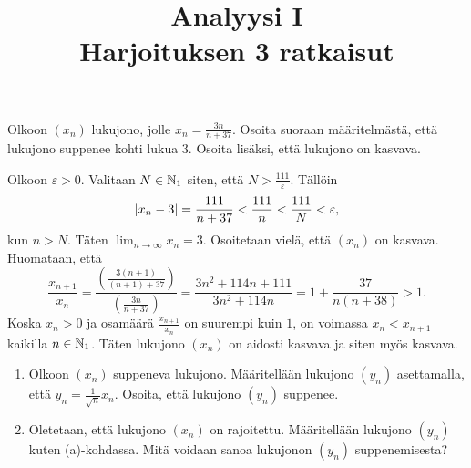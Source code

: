 \documentclass[11pt,a4paper]{amsart}
\title{Analyysi I\\Harjoituksen 3 ratkaisut}
\author{}
\date{}
\begin{document}

\begin{exercise}
  Olkoon \((x_n)\) lukujono, jolle \(x_n = \frac{3n}{n + 37}\). Osoita suoraan
  määritelmästä, että lukujono suppenee kohti lukua \(3\). Osoita lisäksi,
  että lukujono on kasvava.
\end{exercise}

\begin{solution}
  Olkoon \(\varepsilon > 0\). Valitaan \(N \in \mathbb{N}_1\) siten, että \(N >
  \frac{111}{\varepsilon}\). Tällöin
  \[
    \lvert x_n - 3\rvert = \frac{111}{n + 37} < \frac{111}{n} < \frac{111}{N}
    < \varepsilon,
  \]
  kun \(n > N\). Täten \(\lim_{n \to \infty} x_n = 3\). Osoitetaan vielä,
  että \((x_n)\) on kasvava. Huomataan, että
  \[
    \frac{x_{n + 1}}{x_n} = \frac{\left(\frac{3(n + 1)}{(n + 1) +
    37}\right)}{\left(\frac{3n}{n + 37}\right)} = \frac{3n^2 + 114n +
    111}{3n^2 + 114n} = 1 + \frac{37}{n(n + 38)} > 1.
  \]
  Koska \(x_n > 0\) ja osamäärä \(\frac{x_{n + 1}}{x_n}\) on suurempi
  kuin \(1\),
  on voimassa \(x_n < x_{n + 1}\) kaikilla \(n \in \mathbb{N}_1\). Täten
  lukujono \((x_n)\) on aidosti kasvava ja siten myös kasvava.
\end{solution}

\begin{exercise}
  \leavevmode\par
\begin{enumerate}[label=\alph*), nosep]
  \item Olkoon \((x_n)\) suppeneva lukujono. Määritellään lukujono \((y_n)\)
    asettamalla, että \(y_n = \frac{1}{\sqrt{n}}x_n\). Osoita, että lukujono
    \((y_n)\) suppenee.
  \item Oletetaan, että lukujono \((x_n)\) on rajoitettu. Määritellään lukujono
    \((y_n)\) kuten (a)-kohdassa. Mitä voidaan sanoa lukujonon \((y_n)\)
    suppenemisesta?
\end{enumerate}
\end{exercise}
\end{document}
